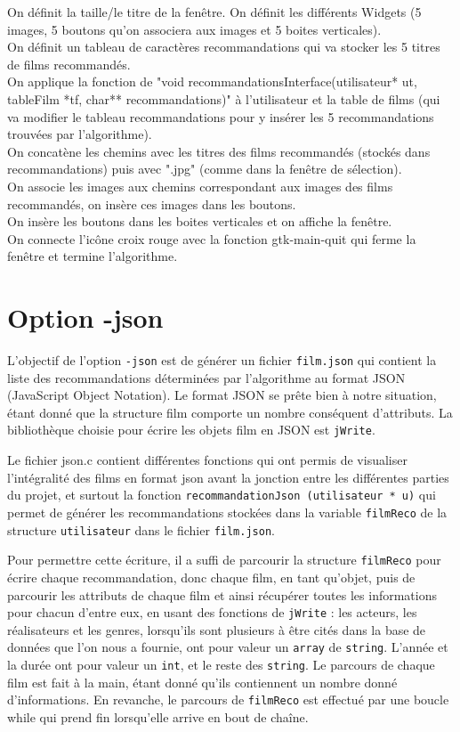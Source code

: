 \documentclass{article}
\begin{document}
On définit la taille/le titre de la fenêtre. On définit les différents Widgets (5 images, 5 boutons qu'on associera aux images et 5 boites verticales).
\noindent
\\ On définit un tableau de caractères recommandations qui va stocker les 5 titres de films recommandés.
\noindent
\\ On applique la fonction de "void recommandationsInterface(utilisateur* ut, tableFilm *tf, char** recommandations)" à l'utilisateur et la table de films (qui va modifier le tableau recommandations pour y insérer les 5 recommandations trouvées par l'algorithme).
\noindent
\\ On concatène les chemins avec les titres des films recommandés (stockés dans recommandations) puis avec ".jpg" (comme dans la fenêtre de sélection).
\noindent
\\ On associe les images aux chemins correspondant aux images des films recommandés, on insère ces images dans les boutons.
\noindent
\\ On insère les boutons dans les boites verticales et on affiche la fenêtre.
\noindent
\\ On connecte l'icône croix rouge avec la fonction gtk-main-quit qui ferme la fenêtre et termine l'algorithme.
\newpage


\section{Option -json}


L'objectif de l'option \verb'-json' est de générer un fichier \verb'film.json' qui contient la liste des recommandations déterminées par l'algorithme au format JSON (JavaScript Object Notation). Le format JSON se prête bien à notre situation, étant donné que la structure film comporte un nombre conséquent d'attributs. La bibliothèque choisie pour écrire les objets film en JSON est \verb'jWrite'. 

Le fichier json.c contient différentes fonctions qui ont permis de visualiser l'intégralité des films en format json avant la jonction entre les différentes parties du projet, et surtout la fonction \verb'recommandationJson (utilisateur * u)' qui permet de générer les recommandations stockées dans la variable \verb'filmReco' de la structure \verb'utilisateur' dans le fichier \verb'film.json'. 

Pour permettre cette écriture, il a suffi de parcourir la structure \verb'filmReco' pour écrire chaque recommandation, donc chaque film, en tant qu'objet, puis de parcourir les attributs de chaque film et ainsi récupérer toutes les informations pour chacun d'entre eux, en usant des fonctions de \verb'jWrite' : les acteurs, les réalisateurs et les genres, lorsqu'ils sont plusieurs à être cités dans la base de données que l'on nous a fournie, ont pour valeur un \verb'array' de \verb'string'. L'année et la durée ont pour valeur un \verb'int', et le reste des \verb'string'. 
Le parcours de chaque film est fait à la main, étant donné qu'ils contiennent un nombre donné d'informations. En revanche, le parcours de \verb'filmReco' est effectué par une boucle while qui prend fin lorsqu'elle arrive en bout de chaîne.
\end{document}
